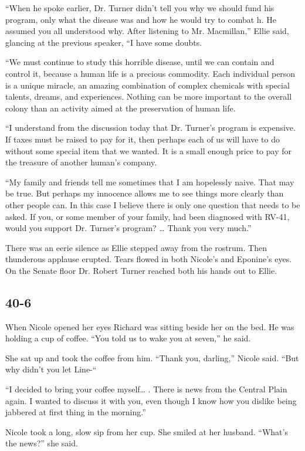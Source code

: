 \documentclass[]{article}
\begin{document}
{“When he spoke earlier, Dr. Turner didn’t tell you why we should fund his program, only what the disease was and how he would try to combat h. He assumed you all understood why. After listening to Mr. Macmillan,” Ellie said, glancing at the previous speaker, “I have some doubts.

“We must continue to study this horrible disease, until we can contain and control it, because a human life is a precious commodity. Each individual person is a unique miracle, an amazing combination of complex chemicals with special talents, dreams, and experiences. Nothing can be more important to the overall colony than an activity aimed at the preservation of human life.

“I understand from the discussion today that Dr. Turner’s program is expensive. If taxes must be raised to pay for it, then perhaps each of us will have to do without some special item that we wanted. It is a small enough price to pay for the treasure of another human’s company.

“My family and friends tell me sometimes that I am hopelessly naive. That may be true. But perhaps my innocence allows me to see things more clearly than other people can. In this case I believe there is only one question that needs to be asked. If you, or some member of your family, had been diagnosed with RV-41, would you support Dr. Turner’s program? … Thank you very much.”

There was an eerie silence as Ellie stepped away from the rostrum. Then thunderous applause erupted. Tears flowed in both Nicole’s and Eponine’s eyes. On the Senate floor Dr. Robert Turner reached both his hands out to Ellie.


\subsection{40-6}

When Nicole opened her eyes Richard was sitting beside her on the bed. He was holding a cup of coffee. “You told us to wake you at seven,” he said.

She sat up and took the coffee from him. “Thank you, darling,” Nicole said. “But why didn’t you let Line-“

“I decided to bring your coffee myself… . There is news from the Central Plain again. I wanted to discuss it with you, even though I know how you dislike being jabbered at first thing in the morning.”

Nicole took a long, slow sip from her cup. She smiled at her husband. “What’s the news?” she said.

}
\end{document}
